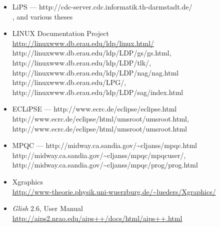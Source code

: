 \begin{description}
\begin{itemize}
\item
LiPS --- 
{http://cdc-server.cdc.informatik.th-darmstadt.de/}\\
,
and various theses
\html{\smallskip}%

\item
LINUX Documentation Project\\
\url{http://linuxwww.db.erau.edu/ldp/linux.html/}\\
%
{http://linuxwww.db.erau.edu/ldp/LDP/gs/gs.html},
%
{http://linuxwww.db.erau.edu/ldp/LDP/tlk/},
%
{http://linuxwww.db.erau.edu/ldp/LDP/nag/nag.html}\\
%
{http://linuxwww.db.erau.edu/LPG/},
%
{http://linuxwww.db.erau.edu/ldp/LDP/sag/index.html}
\html{\smallskip}%

\item
ECLiPSE --- %
{http://www.ecrc.de/eclipse/eclipse.html}\\
%
{http://www.ecrc.de/eclipse/html/umsroot/umsroot.html},
%
{http://www.ecrc.de/eclipse/html/umsroot/umsroot.html}
\html{\smallskip}%

\item
MPQC --- 
{http://midway.ca.sandia.gov/\~{}cljanss/mpqc.html}\\
%
{http://midway.ca.sandia.gov/\~{}cljanss/mpqc/mpqcuser/},
%
{http://midway.ca.sandia.gov/\~{}cljanss/mpqc/prog/prog.html}
\html{\smallskip}%

\item
Xgraphics\\
\url{http://www-theorie.physik.uni-wuerzburg.de/~lueders/Xgraphics/}
\html{\smallskip}%

\item
\textit{Glish} 2.6, User Manual\\
\url{http://aips2.nrao.edu/aips++/docs/html/aips++.html}
\html{\smallskip}%


\end{itemize}
\end{description}
